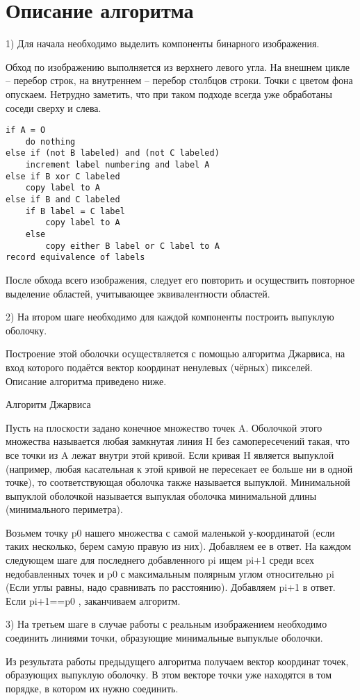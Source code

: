 \documentclass{report}
\begin{document}
\section*{Описание алгоритма}
1) Для начала необходимо выделить компоненты бинарного изображения.
\par
Обход по изображению выполняется из верхнего левого угла. На внешнем цикле – перебор строк, на внутреннем – перебор столбцов строки. Точки с цветом фона опускаем. Нетрудно заметить, что при таком подходе всегда уже обработаны соседи сверху и слева.
\begin{lstlisting}
if A = O
	do nothing
else if (not B labeled) and (not C labeled)
	increment label numbering and label A
else if B xor C labeled
	copy label to A
else if B and C labeled
	if B label = C label
		copy label to A
	else
		copy either B label or C label to A
record equivalence of labels
\end{lstlisting}
\par 
После обхода всего изображения, следует его повторить и осуществить повторное выделение областей, учитывающее эквивалентности областей.
\par 
2) На втором шаге необходимо для каждой компоненты построить выпуклую оболочку.
\par 
Построение этой оболочки осуществляется с помощью алгоритма Джарвиса, на вход которого подаётся вектор координат ненулевых (чёрных) пикселей. Описание алгоритма приведено ниже.
\begin{center}
Алгоритм Джарвиса
\end{center}
\par 
Пусть на плоскости задано конечное множество точек A. Оболочкой этого множества называется любая замкнутая линия H без самопересечений такая, что все точки из A лежат внутри этой кривой. Если кривая H является выпуклой (например, любая касательная к этой кривой не пересекает ее больше ни в одной точке), то соответствующая оболочка также называется выпуклой. Минимальной выпуклой оболочкой называется выпуклая оболочка минимальной длины (минимального периметра).
\par 
Возьмем точку p0 нашего множества с самой маленькой у-координатой (если таких несколько, берем самую правую из них). Добавляем ее в ответ. На каждом следующем шаге для последнего добавленного pi ищем pi+1 среди всех недобавленных точек и p0 с максимальным полярным углом относительно pi (Если углы равны, надо сравнивать по расстоянию). Добавляем pi+1 в ответ. Если pi+1==p0 , заканчиваем алгоритм.
\par
3) На третьем шаге в случае работы с реальным изображением необходимо соединить линиями точки, образующие минимальные выпуклые оболочки.
\par
Из результата работы предыдущего алгоритма получаем вектор координат точек, образующих выпуклую оболочку. В этом векторе точки уже находятся в том порядке, в котором их нужно соединить.
\newpage
\end{document}
